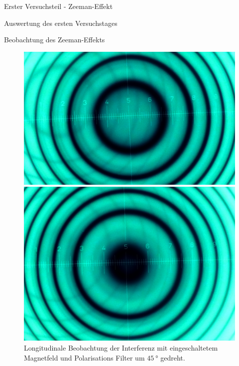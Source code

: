 \documentclass[pdftex, a4paper,11pt, twoside, ngerman]{report}
\begin{document}
\begin{chapter}{Erster Versuchsteil - Zeeman-Effekt}
\begin{section}{Auswertung des ersten Versuchstages}
\begin{subsection}{Beobachtung des Zeeman-Effekts}
        \begin{figure}[b!]
          \centering
          \begin{minipage}{0.48\textwidth}
            \centering
            \includegraphics[width=\textwidth]
                {Figures/parallel4inv.png}
            \caption{Longitudinale Beobachtung der Interferenz mit 
                eingeschaltetem Magnetfeld und Polarisations Filter um
                $\SI{135}{\degree}$ gedreht.}
            \label{fig:para4inv}
          \end{minipage}\quad
          \begin{minipage}{0.48\textwidth}
            \centering
            \includegraphics[width=\textwidth]
                {Figures/parallel5inv.png}
            \caption{Longitudinale Beobachtung der Interferenz mit 
                eingeschaltetem Magnetfeld und Polarisations Filter um 
                $\SI{45}{\degree}$ gedreht.}
            \label{fig:para5inv}
          \end{minipage}
        \end{figure}
        

\end{subsection}
\end{section}
\end{chapter}
\end{document}
